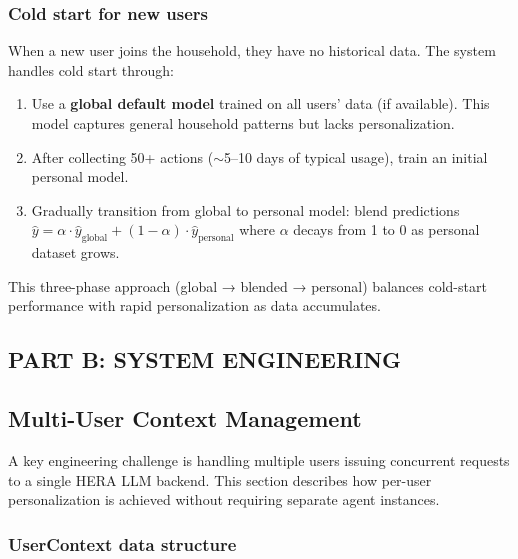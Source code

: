 \subsubsection{Cold start for new users}

When a new user joins the household, they have no historical data. The system handles cold start through:

\begin{enumerate}
    \item Use a \textbf{global default model} trained on all users' data (if available). This model captures general household patterns but lacks personalization.
    
    \item After collecting 50+ actions ($\sim$5--10 days of typical usage), train an initial personal model.
    
    \item Gradually transition from global to personal model: blend predictions $\hat{y} = \alpha \cdot \hat{y}_{\text{global}} + (1 - \alpha) \cdot \hat{y}_{\text{personal}}$ where $\alpha$ decays from 1 to 0 as personal dataset grows.
\end{enumerate}

This three-phase approach (global → blended → personal) balances cold-start performance with rapid personalization as data accumulates.


\subsection*{\Large PART B: SYSTEM ENGINEERING}

\subsection{Multi-User Context Management}
\label{sec:multiuser-context}

A key engineering challenge is handling multiple users issuing concurrent requests to a single HERA LLM backend. This section describes how per-user personalization is achieved without requiring separate agent instances.

\subsubsection{UserContext data structure}

